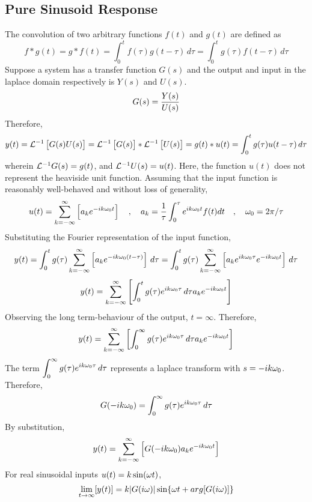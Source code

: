 \documentclass[a4paper, 12pt]{report}
\begin{document}
\begin{center}
\section{Pure Sinusoid Response}
\begin{comment}
\end{comment}
The convolution of two arbitrary functions $f(t)$ and $g(t)$ are defined as
$$f*g(t) = g*f(t) = \int^{t}_{0}f(\tau)g(t - \tau)\,d\tau = \int^{t}_{0}g(\tau)f(t - \tau)\,d\tau$$
Suppose a system has a transfer function $G(s)$ and the output and input in the laplace domain respectively is $Y(s)$ and $U(s)$.
$$G(s) = \frac{Y(s)}{U(s)}$$
Therefore,
$$y(t) = \mathcal{L}^{-1}\left[G(s)U(s)\right] = \mathcal{L}^{-1}\left[ G(s)\right]*\mathcal{L}^{-1}\left[ U(s)\right] = g(t)*u(t) = \int^{t}_{0}g(\tau)u(t - \tau)\,d\tau$$
wherein $\mathcal{L}^{-1}G(s) = g(t)$, and $\mathcal{L}^{-1}U(s) = u(t)$. Here, the function $u(t)$ does not represent the heaviside unit function. Assuming that the input function is reasonably well-behaved and without loss of generality, 
$$u(t) = \sum^{\infty}_{k = -\infty}\left[a_ke^{-ik\omega_0t}\right]\quad,\quad a_k = \frac{1}{\tau}\int^{\tau}_{0}e^{ik\omega_0t}f(t)dt\quad,\quad \omega_0 = 2\pi/\tau$$
Substituting the Fourier representation of the input function,
$$y(t) = \int^{t}_{0}g(\tau)\sum^{\infty}_{k = -\infty}\left[a_ke^{-ik\omega_0(t-\tau)}\right]\,d\tau = \int^{t}_{0}g(\tau)\sum^{\infty}_{k = -\infty}\left[a_ke^{ik\omega_0\tau}e^{-ik\omega_0t}\right]\,d\tau$$
$$y(t) = \sum^{\infty}_{k = -\infty}\left[\int^{t}_{0}g(\tau)e^{ik\omega_0\tau}\,d\tau a_ke^{-ik\omega_0t}\right]$$
Observing the long term-behaviour of the output, $t = \infty$. Therefore,
$$y(t) = \sum^{\infty}_{k = -\infty}\left[\int^{\infty}_{0}g(\tau)e^{ik\omega_0\tau}\,d\tau a_ke^{-ik\omega_0t}\right]$$
The term $\displaystyle{\int^{\infty}_{0}g(\tau)e^{ik\omega_0\tau}\,d\tau}$ represents a laplace transform with $s = -ik\omega_0$. Therefore, 
$$G(-ik\omega_0) = \int^{\infty}_{0}g(\tau)e^{ik\omega_0\tau}\,d\tau$$
By substitution,
$$y(t) = \sum^{\infty}_{k = -\infty}\left[G(-ik\omega_0) a_ke^{-ik\omega_0t}\right]$$
For real sinusoidal inputs $\displaystyle{u(t) = k\sin(\omega t)}$,
$$\lim_{t\to\infty}[y(t)] = k|G(i\omega)|\sin\{\omega t + arg[G(i\omega)]\}$$
\end{center}
\end{document}
